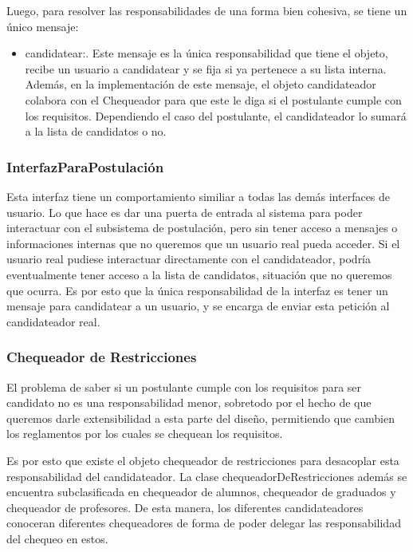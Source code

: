 Luego, para resolver las responsabilidades de una forma bien cohesiva, se tiene un \'unico mensaje:

\begin{itemize}
\item candidatear:. Este mensaje es la \'unica responsabilidad que tiene el objeto, recibe un usuario a candidatear y se fija si ya pertenece a su lista interna. Adem\'as, en la implementaci\'on de este mensaje, el objeto candidateador colabora con el Chequeador para que este le diga si el postulante cumple con los requisitos. Dependiendo el caso del postulante, el candidateador lo sumar\'a a la lista de candidatos o no.
\end{itemize}


\subsubsection{InterfazParaPostulaci\'on}

Esta interfaz tiene un comportamiento similiar a todas las dem\'as interfaces de usuario. Lo que hace es dar una puerta de entrada al sistema para poder interactuar con el subsistema de postulaci\'on, pero sin tener acceso a mensajes o informaciones internas que no queremos que un usuario real pueda acceder. Si el usuario real pudiese interactuar directamente con el candidateador, podr\'ia eventualmente tener acceso a la lista de candidatos, situaci\'on que no queremos que ocurra. Es por esto que la \'unica responsabilidad de la interfaz es tener un mensaje para candidatear a un usuario, y se encarga de enviar esta petici\'on al candidateador real.


\subsubsection{Chequeador de Restricciones}

El problema de saber si un postulante cumple con los requisitos para ser candidato no es una responsabilidad menor, sobretodo por el hecho de que queremos darle extensibilidad a esta parte del diseño, permitiendo que cambien los reglamentos por los cuales se chequean los requisitos.

Es por esto que existe el objeto chequeador de restricciones para desacoplar esta responsabilidad del candidateador. La clase chequeadorDeRestricciones adem\'as se encuentra subclasificada en chequeador de alumnos, chequeador de graduados y chequeador de profesores. De esta manera, los diferentes candidateadores conoceran diferentes chequeadores de forma de poder delegar las responsabilidad del chequeo en estos.

